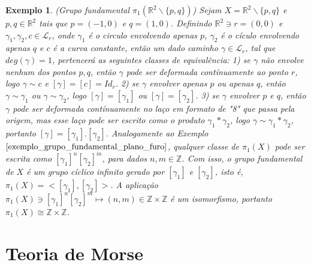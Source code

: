 \documentclass[12pt]{book}
\newtheorem{exemplo}[teorema]{Exemplo}
\newcommand{\caminhospontobase}[1]{\mathcal{L}_{#1}}
\newcommand{\classe}[1]{[#1]}
\newcommand{\grupofundamental}[1]{\pi_{1}(#1)}
\newcommand{\inteiros}{\mathbb{Z}}
\newcommand{\real}[1]{\mathbb{R}^{#1}}
\begin{document}
		\begin{exemplo}
			(Grupo fundamental $\grupofundamental{\real{2}\backslash\{p,q\}}$) Sejam $X = \real{2}\backslash\{p,q\}$ e $p ,q \in \real{2}$ tais que $p = (-1,0)$ e $q=(1,0)$. Definindo  $\real{2} \ni r=(0,0)$ e $\gamma_{1}, \gamma_{2}, c \in \caminhospontobase{r}$, onde $\gamma_{1}$ é o circulo envolvendo apenas $p$, $\gamma_{2}$ é o cículo envolvendo apenas $q$ e $c$ é a curva constante, então um dado caminho $\gamma \in \caminhospontobase{r}$, tal que $deg(\gamma) = 1$, pertencerá as seguintes classes de equivalência: 1) se $\gamma$ não envolve nenhum dos pontos $p,q$, então $\gamma$ pode ser deformada contínuamente ao ponto $r$, logo $\gamma \sim c$ e $\classe{\gamma} =\classe{c}= Id_{r}$. 2) se $\gamma$ envolver apenas $p$ ou apenas $q$, então $\gamma \sim \gamma_{1}$ ou $\gamma \sim \gamma_{2}$, logo $\classe{\gamma }=\classe{\gamma_{1}}$ ou $\classe{\gamma }=\classe{\gamma_{2}}$. 3) se $\gamma$ envolver $p$ e $q$, então $\gamma$ pode ser deformada contínuamente no laço em formato de "8" que passa pela origem, mas esse laço pode ser escrito como o produto $\gamma_{1}*\gamma_{2}$, logo $\gamma \sim \gamma_{1}*\gamma_{2}$, portanto $\classe{\gamma} = \classe{\gamma_{1}}.\classe{\gamma_{2}}$. Analogamente ao Exemplo $\ref{exemplo_grupo_fundamental_plano_furo}$, qualquer classe de $\grupofundamental{X}$ pode ser escrita como $\classe{\gamma_{1}}^{n} \classe{\gamma_{2}}^{m}$, para dados $n,m \in \inteiros$. Com isso, o grupo fundamental de $X$ é um grupo cíclico infinito gerado por $\classe{\gamma_{1}}$ e $\classe{\gamma_{2}}$, isto é, $\grupofundamental{X} = <\classe{\gamma_{1}}, \classe{\gamma_{2}}>$. A aplicação $\grupofundamental{X} \ni \classe{\gamma_{1}}^{n} \classe{\gamma_{2}}^{m} \mapsto (n,m) \in \inteiros\times\inteiros$ é um isomorfismo, portanto $\grupofundamental{X}  \cong \inteiros\times\inteiros$.
		\end{exemplo}
		
	\chapter{Teoria de Morse}
	
\end{document}
